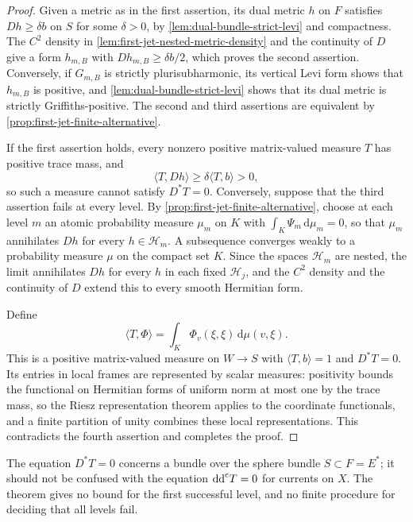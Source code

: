 \begin{proof}
Given a metric as in the first assertion, its dual metric $h$ on $F$ satisfies $Dh\geq\delta b$ on $S$ for some $\delta>0$, by \cref{lem:dual-bundle-strict-levi} and compactness. The $C^2$ density in \cref{lem:first-jet-nested-metric-density} and the continuity of $D$ give a form $h_{m,B}$ with $D h_{m,B}\geq\delta b/2$, which proves the second assertion. Conversely, if $G_{m,B}$ is strictly plurisubharmonic, its vertical Levi form shows that $h_{m,B}$ is positive, and \cref{lem:dual-bundle-strict-levi} shows that its dual metric is strictly Griffiths-positive. The second and third assertions are equivalent by \cref{prop:first-jet-finite-alternative}.

If the first assertion holds, every nonzero positive matrix-valued measure $T$ has positive trace mass, and
\[
 \langle T,Dh\rangle\geq\delta\langle T,b\rangle>0,
\]
so such a measure cannot satisfy $D^*T=0$. Conversely, suppose that the third assertion fails at every level. By \cref{prop:first-jet-finite-alternative}, choose at each level $m$ an atomic probability measure $\mu_m$ on $K$ with $\int_K\Psi_m\,\mathrm d\mu_m=0$, so that $\mu_m$ annihilates $Dh$ for every $h\in\mathcal H_m$. A subsequence converges weakly to a probability measure $\mu$ on the compact set $K$. Since the spaces $\mathcal H_m$ are nested, the limit annihilates $Dh$ for every $h$ in each fixed $\mathcal H_j$, and the $C^2$ density and the continuity of $D$ extend this to every smooth Hermitian form.

Define
\[
 \langle T,\Phi\rangle=\int_K\Phi_v(\xi,\xi)\,\mathrm d\mu(v,\xi).
\]
This is a positive matrix-valued measure on $W\to S$ with $\langle T,b\rangle=1$ and $D^*T=0$. Its entries in local frames are represented by scalar measures: positivity bounds the functional on Hermitian forms of uniform norm at most one by the trace mass, so the Riesz representation theorem applies to the coordinate functionals, and a finite partition of unity combines these local representations. This contradicts the fourth assertion and completes the proof.
\end{proof}

The equation $D^*T=0$ concerns a bundle over the sphere bundle $S\subset F=E^*$; it should not be confused with the equation $\mathrm{dd}^{\mathrm{c}} T=0$ for currents on $X$. The theorem gives no bound for the first successful level, and no finite procedure for deciding that all levels fail.

